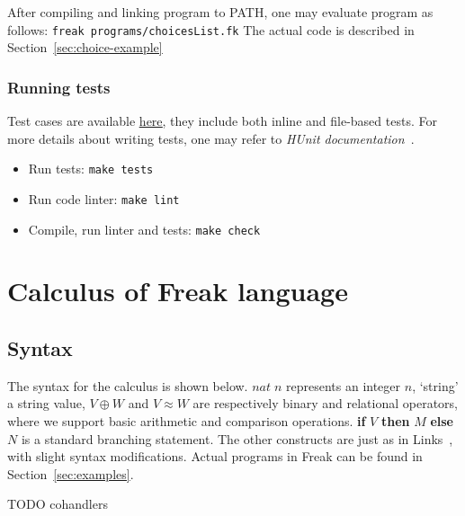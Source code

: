 \documentclass[declaration,shortabstract]{iithesis}
\theoremstyle{definition} \newtheorem{definition}{Definition}[chapter]
\theoremstyle{remark} \newtheorem{remark}[definition]{Observation}
\theoremstyle{plain} \newtheorem{theorem}[definition]{Theorem}
\theoremstyle{plain} \newtheorem{lemma}[definition]{Lemma}
\begin{document}
    After compiling and linking program to PATH, one may evaluate program as
    follows: \verb!freak programs/choicesList.fk! The actual code is described in Section~\ref{sec:choice-example}

    \subsection{Running tests}

    Test cases are available \href{https://github.com/Tomatosoup97/freak/blob/master/src/Tests.hs}{\underline{here}},
    they include both inline and file-based tests. For more details about
    writing tests, one may refer to \textit{HUnit documentation}~\cite{hunit-docs}.

    \begin{itemize}
        \item Run tests: \verb!make tests!
        \item Run code linter: \verb!make lint!
        \item Compile, run linter and tests: \verb!make check!
    \end{itemize}

\chapter{Calculus of Freak language}\label{chapter:calculus-of-freak-language}
\section{Syntax}

    The syntax for the calculus is shown below. $nat \; n$ represents an integer $n$,
    `string' a string value, $V \oplus W$ and $V \approx W$ are respectively
    binary and relational operators, where we support basic arithmetic and
    comparison operations. \textbf{if} $V$ \textbf{then} $M$ \textbf{else} $N$
    is a standard branching statement. The other constructs are just as in
    Links~\cite{handlers-cps-journal}, with slight syntax modifications.
    Actual programs in Freak can be found in Section~\ref{sec:examples}.

    TODO cohandlers
\end{document}
